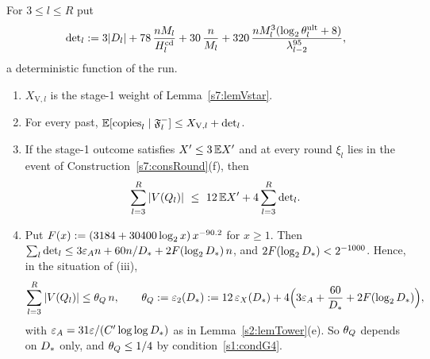 \begin{lemma}\label{s7:lemUHsplit}
For $3\le l\le R$ put
\[
\mathrm{det}_l\mathrel{:=}3|D_l|+78\,\frac{nM_l}{H^{\mathrm{cd}}_l}+30\,\frac{n}{M_l}
+320\,\frac{nM_l^{3}(\log_2\theta^{\mathrm{ult}}_l+8)}{\lambda_{l-2}^{95}},
\]
a deterministic function of the run.
\begin{enumerate}
\item[(i)] $X_{\mathrm{V},l}$ is the stage-1 weight of Lemma~\ref{s7:lemVstar}.
\item[(ii)] For every past, $\mathbb{E}[\mathrm{copies}_l\mid\mathfrak{F}^{-}_l]\le X_{\mathrm{V},l}+\mathrm{det}_l$.
\item[(iii)] If the stage-1 outcome satisfies $X'\le3\,\mathbb{E}X'$ and at every round
$\xi_l$ lies in the event of Construction~\ref{s7:consRound}(f), then
\[
\sum_{l=3}^{R}|V(Q_l)|\ \le\ 12\,\Ex\Xp+4\sum_{l=3}^{R}\dett_l .
\]
\item[(iv)] Put $F(x)\mathrel{:=}(3184+30400\log_2x)\,x^{-90.2}$ for $x\ge1$.
Then $\sum_l\mathrm{det}_l\le3\varepsilon_{A} n+60n/D_{*}+2F(\log_2D_{*})\,n$, and
$2F(\log_2D_{*})<2^{-1000}$. Hence, in the situation of (iii),
\[
\sum_{l=3}^{R}|V(Q_l)|\le\theta_{Q}\,n,\qquad
\theta_{Q}\mathrel{:=}\varepsilon_{2}(D_{*})\mathrel{:=}12\,\varepsilon_{X}(D_{*})+4\Bigl(3\varepsilon_{A}+\frac{60}{D_{*}}+2F(\log_2D_{*})\Bigr),
\]
with $\varepsilon_{A}=31\varepsilon/(C'\log\log D_{*})$ as in Lemma~\ref{s2:lemTower}(e). So
$\theta_{Q}$ depends on $D_{*}$ only, and $\theta_{Q}\le1/4$ by
condition~\ref{s1:condG4}.
\end{enumerate}
\deps{\ref{s7:lemCC}, \ref{s7:lemMULT}, \ref{s7:lemUltra}, \ref{s7:lemVstar}, \ref{s7:lemEXprime}, \ref{s7:defSchedule}, \ref{s2:propOV}, \ref{s2:lemTower}, \ref{s2:lemLacunary}, \ref{s1:condG4}, \ref{s1:condG1}, \ref{s7:consRound}, \ref{s7:lemWellDef}, \ref{s2:defHBtp}, \ref{s6:lemJplus}}
\end{lemma}

